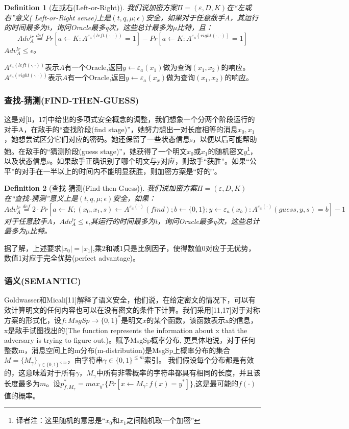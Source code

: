 \documentclass[]{article}
\newtheorem{definition}{Definition}
\begin{document}
\begin{definition}[左或右(Left-or-Right)]
	我们说加密方案$\Pi =(\varepsilon,D,K)$在“左或右”意义( Left-or-Right sense)上是$(t,q,\mu;\epsilon)$安全，如果对于任意敌手$A$，其运行的时间最多为t，询问Oracle最多q次，这些总计最多为$\mu$比特，且：
	\[Adv_A^{lr} \stackrel{def}{=} Pr[a\leftarrow K:A^{\varepsilon_a(left(\cdot,\cdot))}=1] - Pr[a\leftarrow K : A^{\varepsilon_a(right(\cdot,\cdot))}=1]\]
	$Adv_A^{lr} \leq \epsilon$。
\end{definition}
$A^{\varepsilon_a(left(\cdot,\cdot))}$表示$A$有一个Oracle,返回$y\leftarrow \varepsilon_a(x_1)$做为查询$(x_1,x_2)$的响应。
$A^{\varepsilon_a(right(\cdot,\cdot))}$表示$A$有一个Oracle,返回$y\leftarrow \varepsilon_a(x_x)$做为查询$(x_1,x_2)$的响应。

\subsubsection{查找-猜测(FIND-THEN-GUESS)}
这是对[ll，17]中给出的多项式安全概念的调整，我们想象一个分两个阶段运行的对手A，在敌手的“查找阶段(find stage)”，她努力想出一对长度相等的消息$x_0,x_1$，她想尝试区分它们对应的密码。她还保留了一些状态信息s，以便以后可能帮助她。在敌手的“猜测阶段(guess stage)”，她获得了一个明文$x_0$或$x_1$的随机密文$y$\footnote{译者注：这里随机的意思是“$x_0$和$x_1$之间随机取一个加密”}，以及状态信息s。如果敌手正确识别了哪个明文与y对应，则敌手“获胜”。如果“公平”的对手在一半以上的时间内不能明显获胜，则加密方案是“好的”。
\begin{definition}[查找-猜测(Find-then-Guess)]
	我们说加密方案$\Pi =(\varepsilon,D,K)$在“查找-猜测”意义上是$(t,q,\mu;\epsilon)$安全，如果：
	\[Adv_A^{lr} \stackrel{def}{=} 2\cdot Pr[a\leftarrow K;
	(x_0,x_1,s)\leftarrow A^{\varepsilon_a(\cdot)}(find);
	b\leftarrow\{0,1\};
	y\leftarrow \varepsilon_a(x_b):A^{\varepsilon_a(\cdot)}(guess,y,s)=b
	]-1\]
	对于任意敌手$A$，$Adv_A^{lr} \leq \epsilon$,其运行的时间最多为t，询问Oracle最多q次，这些总计最多为$\mu$比特。
\end{definition}

据了解，上述要求$|x_0|=|x_1|$,乘2和减1只是比例因子，使得数值0对应于无优势，数值1对应于完全优势(perfect advantage)。\par

\subsubsection{语义(SEMANTIC)}
Goldwasser和Micali[11]解释了语义安全，他们说，在给定密文的情况下，可以有效计算明文的任何内容也可以在没有密文的条件下计算。我们采用[11,17]对于对称方案的形式化，设$f:MsgSp\rightarrow \{0,1\}^*$是明文$x$的某个函数，该函数表示x的信息，x是敌手试图找出的(The function represents the information about x that the adversary is trying to figure out.)。赋予MsgSp概率分布,
更具体地说，对于任何整数m，消息空间上的m分布(m-distribution)是MsgSp上概率分布的集合$M=\{M_\gamma\}_{\gamma\in \{0,1\}^{\leq m}}$，由字符串$\gamma\in \{0,1\}^{\leq m}$索引。
我们假设每个分布都是有效的，这意味着对于所有$\gamma$，$M_\gamma$中所有非零概率的字符串都具有相同的长度，并且该长度最多为$m$。设$p_{f,M_\gamma}^* = max_{y^*}\{Pr[x\leftarrow M_\gamma : f(x)=y^*]\}$,这是最可能的$f(\cdot)$值的概率。
\end{document}
